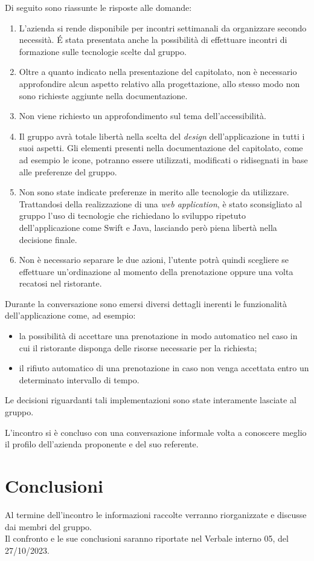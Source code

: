 \noindent
Di seguito sono riassunte le risposte alle domande:
\begin{enumerate}
	\item L'azienda si rende disponibile per incontri settimanali da organizzare secondo necessità. \'E stata presentata anche la possibilità di effettuare incontri di formazione sulle tecnologie scelte dal gruppo.
	\item Oltre a quanto indicato nella presentazione del capitolato, non è necessario approfondire alcun aspetto relativo alla progettazione, allo stesso modo non sono richieste aggiunte nella documentazione.
	\item Non viene richiesto un approfondimento sul tema dell'accessibilità.
	\item Il gruppo avrà totale libertà nella scelta del \textit{design} dell'applicazione in tutti i suoi aspetti. Gli elementi presenti nella documentazione del capitolato, come ad esempio le icone, potranno essere utilizzati, modificati o ridisegnati in base alle preferenze del gruppo.
	\item Non sono state indicate preferenze in merito alle tecnologie da utilizzare. Trattandosi della realizzazione di una \textit{web application}, è stato sconsigliato al gruppo l'uso di tecnologie che richiedano lo sviluppo ripetuto dell'applicazione come Swift e Java, lasciando però piena libertà nella decisione finale.
	\item Non è necessario separare le due azioni, l'utente potrà quindi scegliere se effettuare un'ordinazione al momento della prenotazione oppure una volta recatosi nel ristorante. 
\end{enumerate}
Durante la conversazione sono emersi diversi dettagli inerenti le funzionalità dell'applicazione come, ad esempio:
\begin{itemize}
	\item la possibilità di accettare una prenotazione in modo automatico nel caso in cui il ristorante disponga delle risorse necessarie per la richiesta;
	\item il rifiuto automatico di una prenotazione in caso non venga accettata entro un determinato intervallo di tempo.
\end{itemize} 
Le decisioni riguardanti tali implementazioni sono state interamente lasciate al gruppo.

\noindent
L'incontro si è concluso con una conversazione informale volta a conoscere meglio il profilo dell'azienda proponente e del suo referente.


\section{Conclusioni}
Al termine dell'incontro le informazioni raccolte verranno riorganizzate e discusse dai membri del gruppo. \\
Il confronto e le sue conclusioni saranno riportate nel Verbale interno 05, del 27/10/2023.

